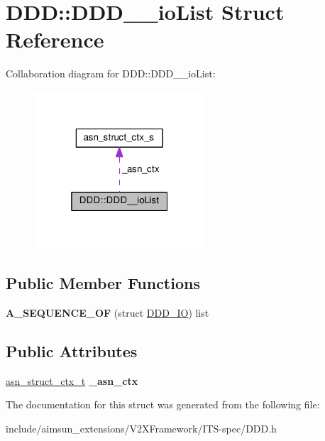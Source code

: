 \hypertarget{structDDD_1_1DDD____ioList}{}\section{D\+DD\+:\+:D\+D\+D\+\_\+\+\_\+io\+List Struct Reference}
\label{structDDD_1_1DDD____ioList}


Collaboration diagram for D\+DD\+:\+:D\+D\+D\+\_\+\+\_\+io\+List\+:\nopagebreak
\begin{figure}[H]
\begin{center}
\leavevmode
\includegraphics[width=181pt]{structDDD_1_1DDD____ioList__coll__graph}
\end{center}
\end{figure}
\subsection*{Public Member Functions}
\begin{DoxyCompactItemize}
\item 
{\bfseries A\+\_\+\+S\+E\+Q\+U\+E\+N\+C\+E\+\_\+\+OF} (struct \hyperlink{structDDD__IO}{D\+D\+D\+\_\+\+IO}) list\hypertarget{structDDD_1_1DDD____ioList_a4854cfa4dcc58d410448d6b3991a3649}{}\label{structDDD_1_1DDD____ioList_a4854cfa4dcc58d410448d6b3991a3649}

\end{DoxyCompactItemize}
\subsection*{Public Attributes}
\begin{DoxyCompactItemize}
\item 
\hyperlink{structasn__struct__ctx__s}{asn\+\_\+struct\+\_\+ctx\+\_\+t} {\bfseries \+\_\+asn\+\_\+ctx}\hypertarget{structDDD_1_1DDD____ioList_aeb0214a0dd6f5a1486a2f1b1065dffd4}{}\label{structDDD_1_1DDD____ioList_aeb0214a0dd6f5a1486a2f1b1065dffd4}

\end{DoxyCompactItemize}


The documentation for this struct was generated from the following file\+:\begin{DoxyCompactItemize}
\item 
include/aimsun\+\_\+extensions/\+V2\+X\+Framework/\+I\+T\+S-\/spec/D\+D\+D.\+h\end{DoxyCompactItemize}
